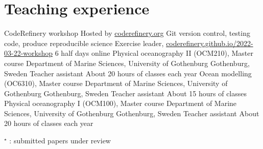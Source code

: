\documentclass[11pt,a4paper,roman]{moderncv}
\begin{document}
        
\section{Teaching experience}
        {CodeRefinery workshop}
        {Hosted by \href{https://coderefinery.org}{coderefinery.org}}
        {Git version control, testing code, produce reproducible science}
        {Exercise leader, \href{https://coderefinery.github.io/2022-03-22-workshop}{coderefinery.github.io/2022-03-22-workshop}}
        {6 half days online}
        {Physical oceanography II (OCM210), Master course}
        {Department of Marine Sciences, University of Gothenburg}
        {Gothenburg, Sweden}
        {Teacher assistant}
        {About 20 hours of classes each year}
        {Ocean modelling (OC6310), Master course}
        {Department of Marine Sciences, University of Gothenburg}
        {Gothenburg, Sweden}
        {Teacher assistant}
        {About 15 hours of classes}
        {Physical oceanography I (OCM100), Master course}
        {Department of Marine Sciences, University of Gothenburg}
        {Gothenburg, Sweden}
        {Teacher assistant}
        {About 20 hours of classes each year}


\nocite{*}



\(^\star\) : submitted papers under review
\end{document}
